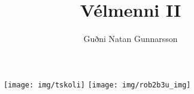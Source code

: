 \documentclass{article}
\begin{document}
\title{Vélmenni II}
\author{Guðni Natan Gunnarsson}
\maketitle
\begin{figure}[h]
\centering
\texttt{[image: img/tskoli]}
\texttt{[image: img/rob2b3u\_img]}
\end{figure}
\newpage
\tableofcontents
\newpage



\newpage



\newpage



\newpage

\end{document}
